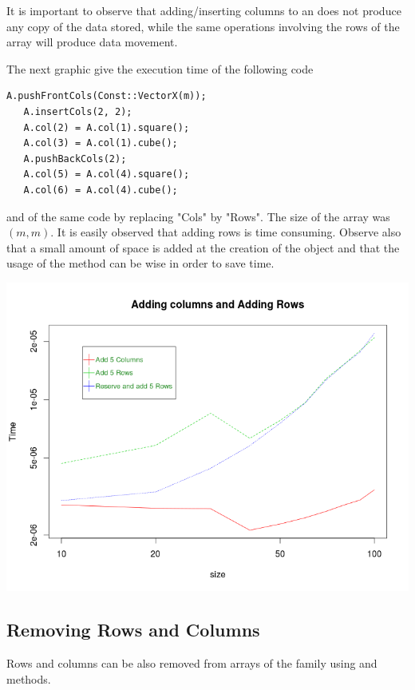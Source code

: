 \documentclass[a4paper,10pt]{article}
\begin{document}
\begin{note}
It is important to observe that adding/inserting columns to an 
does not produce any copy of the data stored, while the same operations
involving the rows of the array will produce data movement.

The next graphic give the execution time of the following code
\begin{lstlisting}[style=customcpp]
   A.pushFrontCols(Const::VectorX(m));
   A.insertCols(2, 2);
   A.col(2) = A.col(1).square();
   A.col(3) = A.col(1).cube();
   A.pushBackCols(2);
   A.col(5) = A.col(4).square();
   A.col(6) = A.col(4).cube();
\end{lstlisting}
and of the same code by replacing "Cols" by "Rows". The size of the array
 was $(m,m)$. It is easily observed that adding rows is time consuming.
Observe also that a small amount of space is added at the creation of the
object and that the usage of the  method can be wise in order to
save time.

\begin{center}
\includegraphics{images/benchAdd.png}
\end{center}
\end{note}

\subsection{Removing Rows and Columns}

Rows and columns can be also removed from arrays of the  family
using  and  methods.
\end{document}
